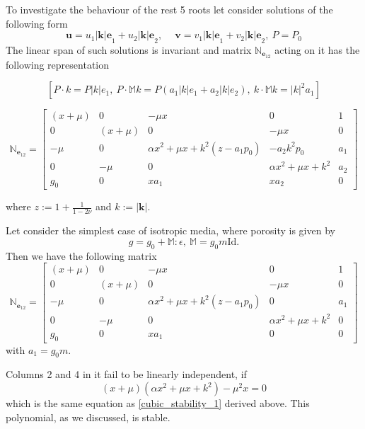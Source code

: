 \documentclass[12pt]{article}
\numberwithin{theorem}{section}
\begin{document}
To investigate the behaviour of the rest 5 roots let consider solutions of the following form
\begin{equation}\mathbf{u} = u_1 \mathbf{|k|e}_1 + u_2 \mathbf{|k|e}_2, \ \quad \mathbf{v} = v_1 \mathbf{|k|e}_1 + v_2 \mathbf{|k|e}_2, \ P = P_0
\end{equation}
The linear span of such solutions is invariant and matrix $\mathbb{N}_{\mathbf{e}_{12}}$ acting on it has the following representation  

\[[P\cdot k = P |k| e_1,\ P\cdot \mathbb{M}k = P (a_1 |k|e_1 + a_2 |k|e_2),\ k \cdot \mathbb{M}k = |k|^2 a_1]\]

\begin{equation}
\mathbb{N}_{\mathbf{e}_{12}} = \left[\begin{array}{ccccc} 
(x+\mu) & 0 & -\mu x & 0 & 1 \\
0 & (x+\mu) & 0 & -\mu x & 0 \\
-\mu & 0 & \alpha x^2 + \mu x+k^2(z-a_1p_0) & -a_2k^2p_0 & a_1 \\
0 & -\mu & 0 & \alpha x^2 + \mu x+k^2 & a_2 \\
g_0 & 0 & xa_1 & xa_2 & 0
\end{array} 
\right]
\end{equation}

 where $z := 1+\frac1{1-2\nu}$ and $k := \mathbf{|k|}.$ 

Let consider the simplest case of isotropic media, where porosity is given by
\[g = g_0 +  \mathbb{M}:\epsilon, \ \mathbb{M}=g_0m\mathrm{Id}.\]
Then we have the following matrix 
\begin{equation}
\mathbb{N}_{\mathbf{e}_{12}} = \left[\begin{array}{ccccc} 
(x+\mu) & 0 & -\mu x & 0 & 1 \\
0 & (x+\mu) & 0 & -\mu x & 0 \\
-\mu & 0 & \alpha x^2 + \mu x+k^2(z-a_1p_0) & 0 & a_1 \\
0 & -\mu & 0 & \alpha x^2 + \mu x+k^2 & 0 \\
g_0 & 0 & xa_1 & 0 & 0
\end{array} 
\right]
\end{equation} with $a_1 = g_0 m.$

Columns 2 and 4 in it fail to be linearly independent, if
\[(x+\mu)(\alpha x^2 + \mu x + k^2) - \mu^2 x =0\] which is the same equation as \eqref{cubic_stability_1} derived above. This polynomial, as we discussed, is stable.  
\end{document}
